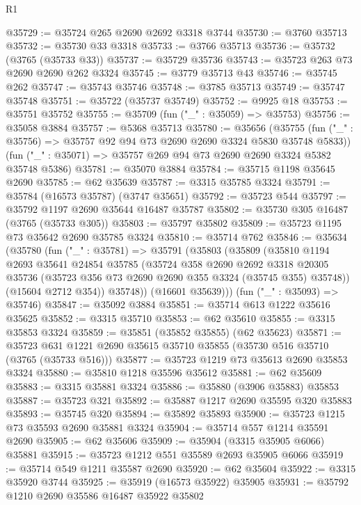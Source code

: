 \begin{lexlean}{R1}
\begin{coremodule}
@35729 := @35724 @265 @2690 @2692 @3318 @3744
@35730 := @3760 @35713
@35732 := @35730 @33 @3318
@35733 := @3766 @35713
@35736 := @35732 (@3765 (@35733 @33))
@35737 := @35729 @35736
@35743 := @35723 @263 @73 @2690 @2690 @262 @3324
@35745 := @3779 @35713 @43
@35746 := @35745 @262
@35747 := @35743 @35746
@35748 := @3785 @35713
@35749 := @35747 @35748
@35751 := @35722 (@35737 @35749)
@35752 := @9925 @18
@35753 := @35751 @35752
@35755 := @35709 (fun ("_" : @35059) => @35753)
@35756 := @35058 @3884
@35757 := @5368 @35713
@35780 := @35656
    (@35755 (fun ("_" : @35756) => @35757 @92 @94 @73 @2690 @2690 @3324 @5830 @35748 @5833))
    (fun ("_" : @35071) => @35757 @269 @94 @73 @2690 @2690 @3324 @5382 @35748 @5386)
@35781 := @35070 @3884
@35784 := @35715 @1198 @35645 @2690
@35785 := @62 @35639
@35787 := @3315 @35785 @3324
@35791 := @35784 (@16573 @35787) (@3747 @35651)
@35792 := @35723 @544
@35797 := @35792 @1197 @2690 @35644 @16487 @35787
@35802 := @35730 @305 @16487 (@3765 (@35733 @305))
@35803 := @35797 @35802
@35809 := @35723 @1195 @73 @35642 @2690 @35785 @3324
@35810 := @35714 @762
@35846 := @35634
    (@35780
      (fun ("_" : @35781) =>
      @35791
        (@35803
          (@35809
            (@35810
              @1194
              @2693
              @35641
              @24854
              @35785
              (@35724
                @358
                @2690
                @2692
                @3318
                @20305
                @35736
                (@35723 @356 @73 @2690 @2690 @355 @3324 (@35745 @355) @35748))
              (@15604 @2712 @354))
            @35748))
        (@16601 @35639)))
    (fun ("_" : @35093) => @35746)
@35847 := @35092 @3884
@35851 := @35714 @613 @1222 @35616 @35625
@35852 := @3315 @35710
@35853 := @62 @35610
@35855 := @3315 @35853 @3324
@35859 := @35851 (@35852 @35855) (@62 @35623)
@35871 := @35723 @631 @1221 @2690 @35615 @35710 @35855 (@35730 @516 @35710 (@3765 (@35733 @516)))
@35877 := @35723 @1219 @73 @35613 @2690 @35853 @3324
@35880 := @35810 @1218 @35596 @35612
@35881 := @62 @35609
@35883 := @3315 @35881 @3324
@35886 := @35880 (@3906 @35883) @35853
@35887 := @35723 @321
@35892 := @35887 @1217 @2690 @35595 @320 @35883
@35893 := @35745 @320
@35894 := @35892 @35893
@35900 := @35723 @1215 @73 @35593 @2690 @35881 @3324
@35904 := @35714 @557 @1214 @35591 @2690
@35905 := @62 @35606
@35909 := @35904 (@3315 @35905 @6066) @35881
@35915 := @35723 @1212 @551 @35589 @2693 @35905 @6066
@35919 := @35714 @549 @1211 @35587 @2690
@35920 := @62 @35604
@35922 := @3315 @35920 @3744
@35925 := @35919 (@16573 @35922) @35905
@35931 := @35792 @1210 @2690 @35586 @16487 @35922 @35802

\end{coremodule}
\end{lexlean}

